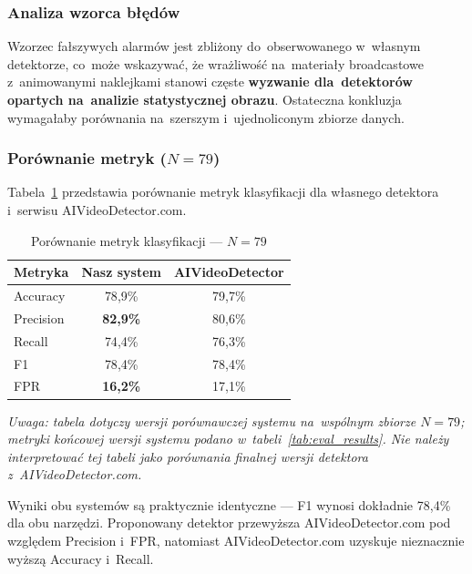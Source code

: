 \subsubsection{Analiza wzorca b\l{}\k{e}d\'{o}w}

Wzorzec fa\l{}szywych alarm\'{o}w jest zbli\.{z}ony do~obserwowanego
w~w\l{}asnym detektorze, co~mo\.{z}e wskazywa\'{c}, \.{z}e wra\.{z}liwo\'{s}\'{c}
na~materia\l{}y broadcastowe z~animowanymi naklejkami
stanowi cz\k{e}ste \textbf{wyzwanie dla~detektor\'{o}w opartych
na~analizie statystycznej obrazu}.
Ostateczna konkluzja wymaga\l{}aby por\'{o}wnania na~szerszym
i~ujednoliconym zbiorze danych.

\subsubsection{Por\'{o}wnanie metryk ($N=79$)}

Tabela~\ref{tab:metryki_ogolne} przedstawia por\'{o}wnanie metryk
klasyfikacji dla w\l{}asnego detektora i~serwisu AIVideoDetector.com.

\begin{table}[htbp]
\centering
{\setlength{\tabcolsep}{10pt}\renewcommand{\arraystretch}{1.3}
\caption{Por\'{o}wnanie metryk klasyfikacji --- $N=79$}
\label{tab:metryki_ogolne}
\small
\begin{tabular}{lcc}
\toprule
\textbf{Metryka} & \textbf{Nasz system} & \textbf{AIVideoDetector} \\
\midrule
Accuracy  & 78{,}9\% & 79{,}7\% \\
Precision & \textbf{82{,}9\%} & 80{,}6\% \\
Recall    & 74{,}4\% & 76{,}3\% \\
F1        & 78{,}4\% & 78{,}4\% \\
FPR       & \textbf{16{,}2\%} & 17{,}1\% \\
\bottomrule
\end{tabular}}
\end{table}

\noindent\textit{Uwaga: tabela dotyczy wersji porównawczej systemu na~wspólnym zbiorze
$N=79$; metryki końcowej wersji systemu podano w~tabeli~\ref{tab:eval_results}.
Nie należy interpretować tej tabeli jako porównania finalnej wersji detektora
z~AIVideoDetector.com.}

Wyniki obu system\'{o}w s\k{a} praktycznie identyczne ---
F1 wynosi dok\l{}adnie 78{,}4\% dla obu narz\k{e}dzi.
Proponowany detektor przewy\.{z}sza AIVideoDetector.com
pod wzgl\k{e}dem Precision i~FPR, natomiast AIVideoDetector.com
uzyskuje nieznacznie wy\.{z}sz\k{a} Accuracy i~Recall.

